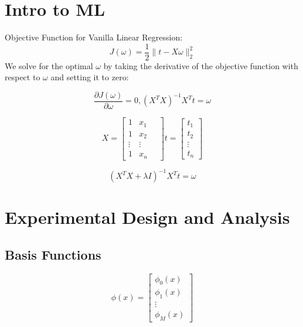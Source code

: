 \documentclass[10pt]{article}
\begin{document}
\begin{multicols}{2}
\section*{Intro to ML}
Objective Function for Vanilla Linear Regression:
\begin{equation}
    J(\omega) = \frac{1}{2} \lVert{t - X\omega} \rVert^{2}_{2}
\end{equation}
We solve for the optimal $\omega$ by taking the derivative of the objective function with respect to $\omega$ and setting it to zero:

\begin{equation}
    \frac{\partial J(\omega)}{\partial \omega} = 0, (X^{T}X)^{-1}X^{T}t = \omega
\end{equation}

\begin{equation} \label{eq:feature-target}
    X = \begin{bmatrix} 
    1 & x_{1} \\
    1 & x_{2} \\
    \vdots & \vdots \\
    1 & x_{n}
    \quad
    \end{bmatrix}
    t = \begin{bmatrix}
    t_{1} \\
    t_{2} \\
    \vdots \\
    t_{n}
    \end{bmatrix}
\end{equation}

\begin{equation}
    \label{eq:ridge}
    (X^{T}X + \lambda I)^{-1}X^{T}t = \omega
\end{equation}

\section*{Experimental Design and Analysis}
\subsection*{Basis Functions}

\begin{equation}
    \phi(x) = \begin{bmatrix}
    \phi_{0}(x) \\
    \phi_{1}(x) \\
    \vdots \\
    \phi_{M}(x)
    \end{bmatrix}
\end{equation}


\end{multicols}
\end{document}
